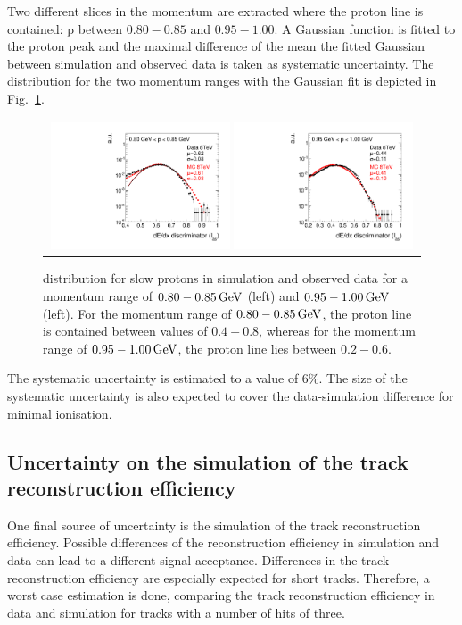 Two different slices in the momentum are extracted where the proton line is contained: p between $0.80-0.85$ and $0.95-1.00$.
A Gaussian function is fitted to the proton peak and the maximal difference of the mean the fitted Gaussian between simulation and observed data is taken as systematic uncertainty.
The \ias distribution for the two momentum ranges with the Gaussian fit is depicted in Fig.~\ref{fig:IasSlowProtons}.
\begin{figure}[!h]
  \centering 
  \begin{tabular}{c}
    \includegraphics[width=0.49\textwidth]{figures/analysis/Interpretation/hIas_analysis_2015_11_30_ForThesis_ptmin0p80_ptmax0p85.pdf} 
    \includegraphics[width=0.49\textwidth]{figures/analysis/Interpretation/hIas_analysis_2015_11_30_ForThesis_ptmin0p95_ptmax1p0.pdf}
  \end{tabular}
  \caption{\ias distribution for slow protons in simulation and observed data for a momentum range of $0.80-0.85\,\text{Ge}\kern-0.06667em\text{V}$ (left) and $0.95-1.00\,\text{Ge}\kern-0.06667em\text{V}$ (left).
           For the momentum range of $0.80-0.85\,\text{Ge}\kern-0.06667em\text{V}$, the proton line is contained between \ias values of $0.4-0.8$, whereas for the momentum range of $0.95-1.00\,\text{Ge}\kern-0.06667em\text{V}$, the proton line \ias lies between $0.2-0.6$.  }
  \label{fig:IasSlowProtons}
\end{figure} 
The systematic uncertainty is estimated to a value of 6\%.
The size of the systematic uncertainty is also expected to cover the data-simulation difference for minimal ionisation.


\subsection*{Uncertainty on the simulation of the track reconstruction efficiency}
One final source of uncertainty is the simulation of the track reconstruction efficiency.
Possible differences of the reconstruction efficiency in simulation and data can lead to a different signal acceptance.
Differences in the track reconstruction efficiency are especially expected for short tracks.
Therefore, a worst case estimation is done, comparing the track reconstruction efficiency in data and simulation for tracks with a number of hits of three.

